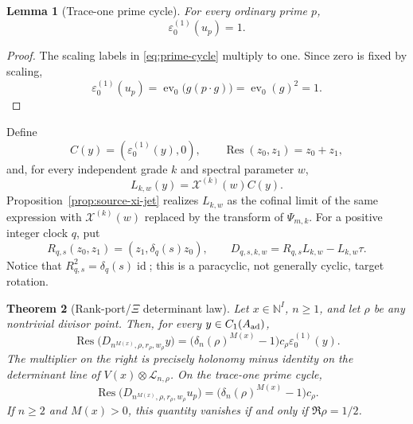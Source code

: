 \documentclass[11pt,a4paper]{amsart}
\theoremstyle{plain}
\newtheorem{theorem}{Theorem}[section]
\newtheorem{lemma}[theorem]{Lemma}
\theoremstyle{definition}
\newcommand{\NN}{\mathbb N}
\begin{document}
\begin{lemma}[Trace-one prime cycle]\label{lem:prime-trace-one}
For every ordinary prime $p$,
\[
                         \varepsilon_0^{(1)}(u_p)=1.
\]
\end{lemma}

\begin{proof}
The scaling labels in \eqref{eq:prime-cycle} multiply to one.  Since zero is fixed by scaling,
\[
 \varepsilon_0^{(1)}(u_p)
 =\operatorname{ev}_0\bigl(g(p\cdot g)\bigr)
 =\operatorname{ev}_0(g)^2=1.
\]
\end{proof}

Define
\[
 C(y)=(\varepsilon_0^{(1)}(y),0),\qquad
 \operatorname{Res}(z_0,z_1)=z_0+z_1,
\]
and, for every independent grade $k$ and spectral parameter $w$,
\[
 L_{k,w}(y)=\mathcal X^{(k)}(w)C(y).
\]
Proposition~\ref{prop:source-xi-jet} realizes $L_{k,w}$ as the cofinal limit of the same expression
with $\mathcal X^{(k)}(w)$ replaced by the transform of $\Psi_{m,k}$.  For a positive integer
clock $q$, put
\begin{equation}\label{eq:paracyclic-rotation}
 R_{q,s}(z_0,z_1)=(z_1,\delta_q(s)z_0),\qquad
 D_{q,s,k,w}=R_{q,s}L_{k,w}-L_{k,w}\tau.
\end{equation}
Notice that $R_{q,s}^2=\delta_q(s)\operatorname{id}$; this is a paracyclic, not generally cyclic,
target rotation.

\begin{theorem}[Rank-port/$\Xi$ determinant law]\label{thm:rank-port-xi}
Let $x\in\NN^I$, $n\geq1$, and let $\rho$ be any nontrivial divisor point.  Then, for every
$y\in C_1(A_{\rm ad})$,
\begin{equation}\label{eq:rank-port-xi}
 \boxed{\;
 \operatorname{Res}\bigl(D_{n^{M(x)},\rho,r_\rho,w_\rho}y\bigr)
 =\bigl(\delta_n(\rho)^{M(x)}-1\bigr)c_\rho
      \varepsilon_0^{(1)}(y).
 \;}
\end{equation}
The multiplier on the right is precisely holonomy minus identity on the determinant line of
$V(x)\otimes\mathcal L_{n,\rho}$.  On the trace-one prime cycle,
\begin{equation}\label{eq:prime-rank-port-xi}
 \operatorname{Res}\bigl(D_{n^{M(x)},\rho,r_\rho,w_\rho}u_p\bigr)
       =\bigl(\delta_n(\rho)^{M(x)}-1\bigr)c_\rho.
\end{equation}
If $n\geq2$ and $M(x)>0$, this quantity vanishes if and only if
$\Re\rho=1/2$.
\end{theorem}
\end{document}
